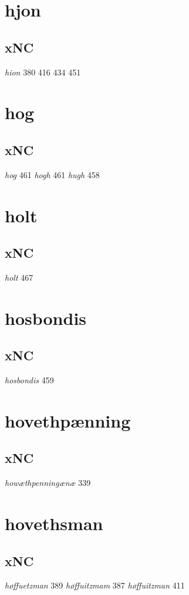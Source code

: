 \documentclass[a4paper,twocolumn]{article}
\begin{document}
\section{hjon}
\label{sec:org648e8fd}
\subsection{xNC}
\label{sec:orgc76c78b}
\emph{hion} 380 416 434 451 
\section{hog}
\label{sec:org053f105}
\subsection{xNC}
\label{sec:orgf6034e7}
\emph{hog} 461 \emph{hogh} 461 \emph{hugh} 458 
\section{holt}
\label{sec:org042b12d}
\subsection{xNC}
\label{sec:org649a022}
\emph{holt} 467 
\section{hosbondis}
\label{sec:org334432e}
\subsection{xNC}
\label{sec:org5f74265}
\emph{hosbondis} 459 
\section{hovethpænning}
\label{sec:orgd2d7d75}
\subsection{xNC}
\label{sec:orga8134d3}
\emph{howæthpenningænæ} 339 
\section{hovethsman}
\label{sec:orgf0bf546}
\subsection{xNC}
\label{sec:org6bdd065}
\emph{høffuetzman} 389 \emph{høffuitzmam} 387 \emph{høffuitzman} 411 
\end{document}
